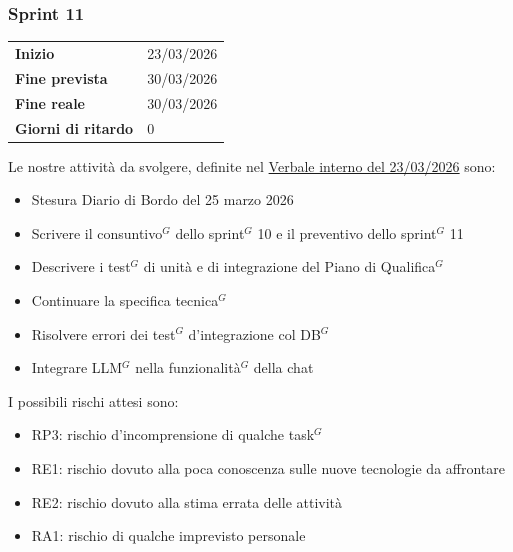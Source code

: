 \subsubsection{Sprint 11}


\begin{tabular}{p{} p{}}
	\textbf{Inizio} & 23/03/2026 \\
	\textbf{Fine prevista} & 30/03/2026 \\
	\textbf{Fine reale} & 30/03/2026 \\
	\textbf{Giorni di ritardo} & 0
\end{tabular}
\newline \newline 
Le nostre attività da svolgere, definite nel \href{https://nullpointersgroup.github.io/Documentazione/output/PB/Verbali%20Interni/2026-03-23_verbale_interno.pdf}{Verbale interno del 23/03/2026} sono:
\begin{itemize}[itemsep=5pt, parsep=1pt, label=$\scriptstyle\bullet$]
	\item Stesura Diario di Bordo del 25 marzo 2026
	\item Scrivere il consuntivo$^G$ dello sprint$^G$ 10 e il preventivo dello sprint$^G$ 11
	\item Descrivere i test$^G$ di unità e di integrazione del Piano di Qualifica$^G$
	\item Continuare la specifica tecnica$^G$
	\item Risolvere errori dei test$^G$ d'integrazione col DB$^G$
	\item Integrare LLM$^G$ nella funzionalità$^G$ della chat
\end{itemize}

I possibili rischi attesi sono:
\begin{itemize}[itemsep=5pt, parsep=1pt, label=$\scriptstyle\bullet$]
	\item RP3: rischio d'incomprensione di qualche task$^G$
	\item RE1: rischio dovuto alla poca conoscenza sulle nuove tecnologie da affrontare
	\item RE2: rischio dovuto alla stima errata delle attività
	\item RA1: rischio di qualche imprevisto personale
\end{itemize}


